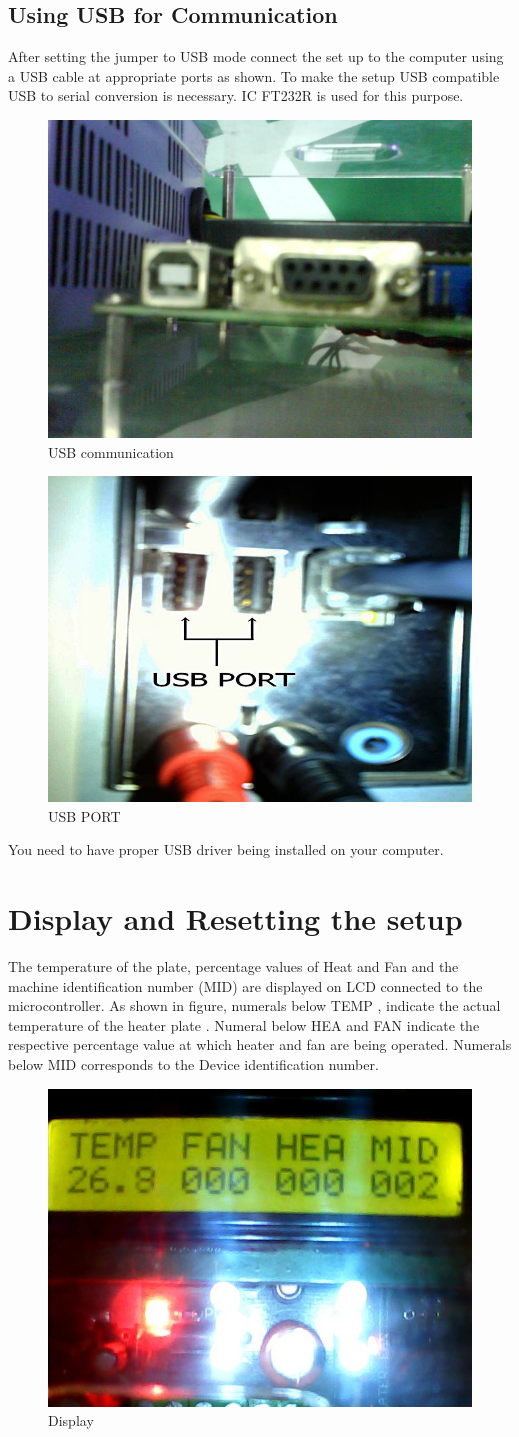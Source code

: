 \documentclass[12pt]{report}
\begin{document}
\subsection{Using USB for Communication}
After setting the jumper to USB mode connect the set up to the computer using a USB cable at appropriate ports as shown. To make the setup USB compatible USB to serial conversion is necessary. IC FT232R is used for this purpose.
\begin{figure}
\centering
\includegraphics[width=0.5\linewidth]{usbc.jpg}
\caption{USB communication}
\end{figure}
\begin{figure}
\centering
\includegraphics[width=0.5\linewidth]{usbp.jpg}
\caption{USB PORT}
\end{figure}
You need to have proper USB driver being installed on your computer.
\section{Display and Resetting the setup}
The temperature of the plate, percentage values of Heat and Fan and the machine identification number (MID) are displayed on LCD connected to the microcontroller.
As shown in figure, numerals below TEMP , indicate the actual temperature of the heater plate . Numeral below HEA and FAN indicate the respective percentage value at which heater and fan are being operated. Numerals below MID corresponds to the Device identification number.
\begin{figure}
\centering
\includegraphics[width=0.5\linewidth]{display.jpg}
\caption{Display}
\end{figure}
\end{document}
